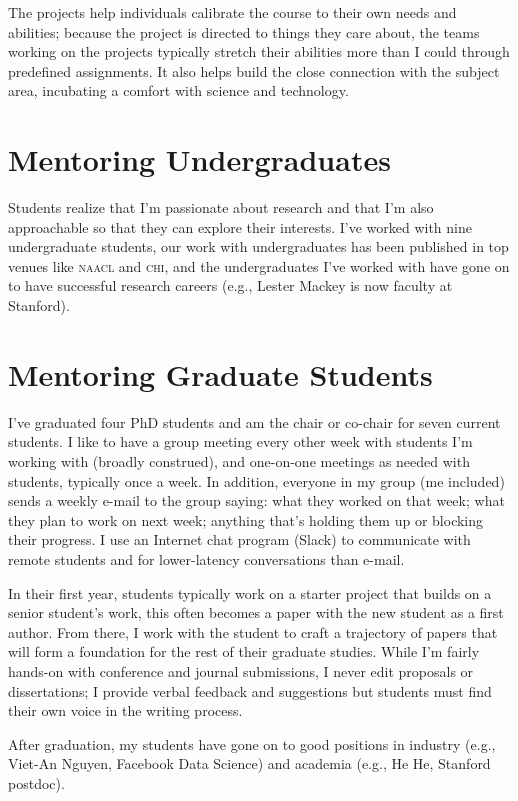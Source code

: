 \documentclass[11pt]{amsart}
\newcommand{\abr}[1]{\textsc{#1}}
\begin{document}
The projects help individuals calibrate the course to their own needs
and abilities; because the project is directed to things they
care about, the teams working on the projects typically stretch their
abilities more than I could through predefined assignments.  It also
helps build the close connection with the subject area, incubating a
comfort with science and technology.

\section{Mentoring Undergraduates}

Students realize that I'm passionate about research and that I'm also
approachable so that they can explore their interests.  I've worked
with nine undergraduate students, our work with undergraduates has
been published in top venues like \abr{naacl} and \abr{chi}, and the
undergraduates I've worked with have gone on to have successful
research careers (e.g., Lester Mackey is now faculty at Stanford).

\section{Mentoring Graduate Students}

I've graduated four PhD students and am the chair or co-chair for
seven current students.  I like to have a group meeting every other
week with students I'm working with (broadly construed), and
one-on-one meetings as needed with students, typically once a week. In
addition, everyone in my group (me included) sends a weekly e-mail to
the group saying: what they worked on that week; what they plan to work
on next week; anything that's holding them up or blocking their
progress. I use an Internet chat program (Slack) to communicate with remote
students and for lower-latency conversations than e-mail.

In their first year, students typically work on a starter project that
builds on a senior student's work, this often becomes a paper with the
new student as a first author.  From there, I work with the student to
craft a trajectory of papers that will form a foundation for the rest
of their graduate studies.  While I'm fairly hands-on with conference
and journal submissions, I never edit proposals or dissertations; I
provide verbal feedback and suggestions but students must find their
own voice in the writing process.  

After graduation, my students have gone on to good positions in
industry (e.g., Viet-An Nguyen, Facebook Data Science) and academia
(e.g., He He, Stanford postdoc).
\end{document}
